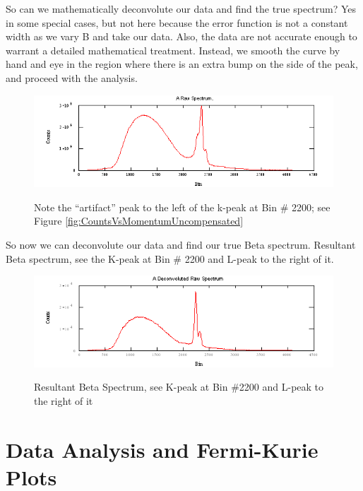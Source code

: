 \documentclass{../lab}
\begin{document}
So can we mathematically deconvolute our data and find the true spectrum? Yes in some special cases, but not here because the error function is not a constant width as we vary B and take our data. Also, the data are not accurate enough to warrant a detailed mathematical treatment. Instead, we smooth the curve by hand and eye in the region where there is an extra bump on the side of the peak, and proceed with the analysis.

\begin{figure}[h]
    \centering
    \href{http://experimentationlab.berkeley.edu/sites/default/files/images/BRAimage041.gif}{\includegraphics[width=0.5\linewidth]{images/BRAimage041.png}}
    \caption{Note the ``artifact'' peak to the left of the k-peak at Bin \# 2200; see Figure \ref{fig:CountsVsMomentumUncompensated}}
    \label{fig:RawSpectrum}
\end{figure}

So now we can deconvolute our data and find our true Beta spectrum. Resultant Beta spectrum, see the K-peak at Bin \# 2200 and L-peak to the right of it.

\begin{figure}[h]
    \centering
    \href{http://experimentationlab.berkeley.edu/sites/default/files/images/BRAimage042.gif}{\includegraphics[width=0.5\linewidth]{images/BRAimage042.png}}
    \caption{Resultant Beta Spectrum, see K-peak at Bin \#2200 and L-peak to the right of it}
    \label{fig:DeconvolutedRawSpectrum}
\end{figure}

\section{Data Analysis and Fermi-Kurie Plots}
\end{document}
